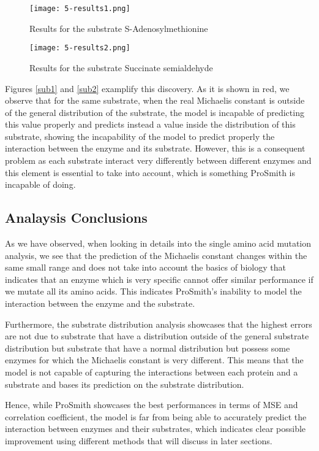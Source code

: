 \begin{figure}
    \centering
    \texttt{[image: 5-results1.png]}
    \caption{Results for the substrate S-Adenosylmethionine}
    \label{fig:sub1}
  \end{figure}

\begin{figure}
    \centering
    \texttt{[image: 5-results2.png]}
    \caption{Results for the substrate Succinate semialdehyde}
    \label{fig:sub2}
  \end{figure}

Figures \ref{sub1} and \ref{sub2} examplify this discovery. As it is shown in red, we observe that for the same
substrate, when the real Michaelis constant is outside of the general distribution of the substrate, the model
is incapable of predicting this value properly and predicts instead a value inside the distribution of this
substrate, showing the incapability of the model to predict properly the interaction between the enzyme and
its substrate. However, this is a consequent problem as each substrate interact very differently between
different enzymes and this element is essential to take into account, which is something ProSmith is
incapable of doing.

\subsection{Analaysis Conclusions}

As we have observed, when looking in details into the single amino acid mutation analysis, we see that 
the prediction of the Michaelis constant changes within the same small range and does not take into account
the basics of biology that indicates that an enzyme which is very specific cannot offer similar performance
if we mutate all its amino acids. This indicates ProSmith's inability to model the interaction between
the enzyme and the substrate.

Furthermore, the substrate distribution analysis showcases that the highest errors are not due to substrate that
have a distribution outside of the general substrate distribution but substrate that have a normal distribution
but possess some enzymes for which the Michaelis constant is very different. This means that the model is
not capable of capturing the interactions between each protein and a substrate and bases its prediction on the
substrate distribution.

Hence, while ProSmith showcases the best performances in terms of MSE and correlation coefficient, the model
is far from being able to accurately predict the interaction between enzymes and their substrates, which indicates
clear possible improvement using different methods that will discuss in later sections. 

